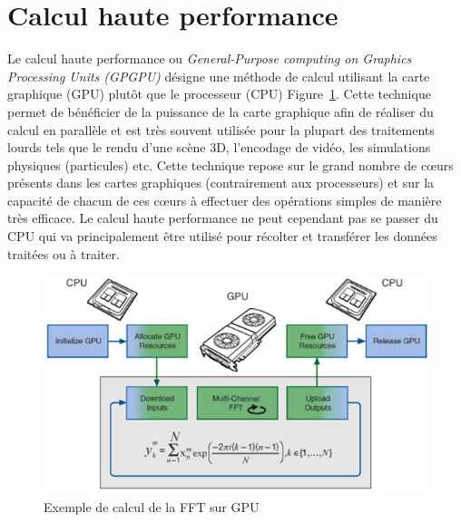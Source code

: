 \section{Calcul haute performance}
Le calcul haute performance ou \emph{General-Purpose computing on Graphics Processing Units (GPGPU)} désigne une méthode de calcul utilisant la carte graphique (GPU) plutôt que le processeur (CPU) Figure~\ref{fig:gpgpu}. Cette technique permet de bénéficier de la puissance de la carte graphique afin de réaliser du calcul en parallèle et est très souvent utilisée pour la plupart des traitements lourds tels que le rendu d'une scène 3D, l'encodage de vidéo, les simulations physiques (particules) etc. Cette technique repose sur le grand nombre de cœurs présents dans les cartes graphiques (contrairement aux processeurs) et sur la capacité de chacun de ces cœurs à effectuer des opérations simples de manière très efficace. Le calcul haute performance ne peut cependant pas se passer du CPU qui va principalement être utilisé pour récolter et transférer les données traitées ou à traiter.

\begin{figure}[H]
\centering
\includegraphics[scale=0.7]{images/gpuworkflow}
\caption{Exemple de calcul de la FFT sur GPU\protect\footnotemark}
\label{fig:gpgpu}
\end{figure}

